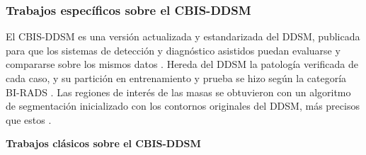 
\subsubsection{Trabajos específicos sobre el CBIS-DDSM}
\label{sec:trabajos_cbis_ddsm}

El CBIS-DDSM es una versión actualizada y estandarizada del DDSM, publicada para que los sistemas de detección y diagnóstico asistidos puedan evaluarse y compararse sobre los mismos datos \cite{Lee2017CBISDDSM}. Hereda del DDSM la patología verificada de cada caso, y su partición en entrenamiento y prueba se hizo según la categoría BI-RADS \cite{Lee2017CBISDDSM}.
Las regiones de interés de las masas se obtuvieron con un algoritmo de segmentación inicializado con los contornos originales del DDSM, más precisos que estos \cite{Lee2017CBISDDSM}.

\textbf{Trabajos clásicos sobre el CBIS-DDSM}

